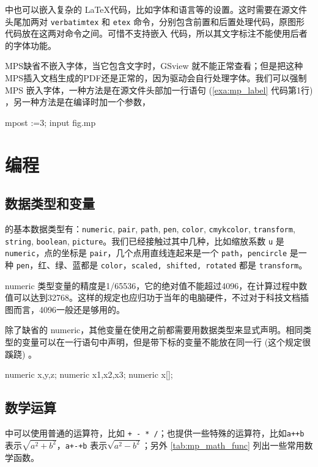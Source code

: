 \MP 中也可以嵌入复杂的 \LaTeX 代码，比如字体和语言等的设置。这时需要在源文件头尾加两对 \texttt{verbatimtex} 和 \texttt{etex} 命令，分别包含前置和后置处理代码，原图形代码放在这两对命令之间。可惜\MP 不支持嵌入 \XeLaTeX 代码，所以其文字标注不能使用后者的字体功能。

MPS缺省不嵌入字体，当它包含文字时，GSview 就不能正常查看；但是把这种MPS插入文档生成的PDF还是正常的，因为驱动会自行处理字体。我们可以强制 MPS 嵌入字体，一种方法是在源文件头部加一行语句 (\autoref{exa:mp_label} 代码第1行) ，另一种方法是在编译时加一个参数，

\begin{Code}[]
mpost \prologues:=3; input fig.mp
\end{Code}

\section{编程}
\subsection{数据类型和变量}

\MP 的基本数据类型有：\texttt{numeric}, \texttt{pair}, \texttt{path}, \texttt{pen}, \texttt{color}, \texttt{cmykcolor}, \texttt{transform}, \texttt{string}, \texttt{boolean}, \texttt{picture}。我们已经接触过其中几种，比如缩放系数 \texttt{u} 是 \texttt{numeric}，点的坐标是 \texttt{pair}，几个点用直线连起来是一个 \texttt{path}，\texttt{pencircle} 是一种 \texttt{pen}，红、绿、蓝都是 \texttt{color}，\texttt{scaled, shifted, rotated} 都是 \texttt{transform}。

numeric 类型变量的精度是1/65536，它的绝对值不能超过4096，在计算过程中数值可以达到32768。这样的规定也应归功于当年的电脑硬件，不过对于科技文档插图而言，4096一般还是够用的。

除了缺省的 numeric，其他变量在使用之前都需要用数据类型来显式声明。相同类型的变量可以在一行语句中声明，但是带下标的变量不能放在同一行 (这个规定很蹊跷) 。

\begin{Code}
numeric x,y,z;    %
numeric x1,x2,x3; %
numeric x[];      %
\end{Code}

\subsection{数学运算}

\MP 中可以使用普通的运算符，比如 \verb|+ - * /|；也提供一些特殊的运算符，比如\verb|a++b| 表示$\sqrt{a^2+b^2}$，\verb|a+-+b| 表示$\sqrt{a^2-b^2}$；另外 \autoref{tab:mp_math_func} 列出一些常用数学函数。

